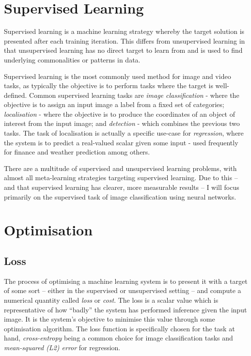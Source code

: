 \documentclass{report}
\begin{document}
	\section{Supervised Learning}
	Supervised learning is a machine learning strategy whereby the target solution is presented after each training iteration. This differs from unsupervised learning in that unsupervised learning has no direct target to learn from and is used to find underlying commonalities or patterns in data. \par
	Supervised learning is the most commonly used method for image and video tasks, as typically the objective is to perform tasks where the target is well-defined. Common supervised learning tasks are \textit{image classification} - where the objective is to assign an input image a label from a fixed set of categories; \textit{localisation} - where the objective is to produce the coordinates of an object of interest from the input image; and \textit{detection} - which combines the previous two tasks. The task of localisation is actually a specific use-case for \textit{regression}, where the system is to predict a real-valued scalar given some input - used frequently for finance and weather prediction among others. \par
	There are a multitude of supervised and unsupervised learning problems, with  almost all meta-learning strategies targeting supervised learning. Due to this -- and that supervised learning has clearer, more measurable results -- I will focus primarily on the supervised task of image classification using neural networks. \par
	

	\section{Optimisation}
	\subsection{Loss} \label{loss:1}
	The process of optimising a machine learning system is to present it with a target of some sort -- either in the supervised or unsupervised setting -- and compute a numerical quantity called \textit{loss} or \textit{cost}. The loss is a scalar value which is representative of how ``badly'' the system has performed inference given the input image. It is the system's objective to minimise this value through some optimisation algorithm. The loss function is specifically chosen for the task at hand, \textit{cross-entropy} being a common choice for image classification tasks and \textit{mean-squared (L2) error}  for regression. \\
	
\end{document}
